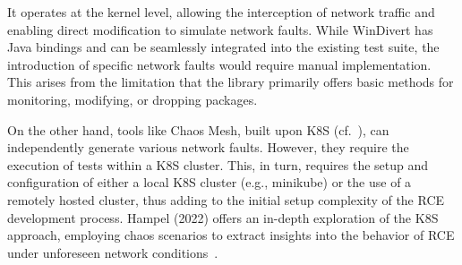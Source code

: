 It operates at the kernel level, allowing the interception of network traffic and enabling direct modification to simulate network faults. While WinDivert has Java bindings and can be seamlessly integrated into the existing test suite, the introduction of specific network faults would require manual implementation. This arises from the limitation that the library primarily offers basic methods for monitoring, modifying, or dropping packages.

On the other hand, tools like Chaos Mesh, built upon \ac{K8S} (cf.~), can independently generate various network faults. However, they require the execution of tests within a \ac{K8S} cluster. This, in turn, requires the setup and configuration of either a local \ac{K8S} cluster (e.g., minikube) or the use of a remotely hosted cluster, thus adding to the initial setup complexity of the \ac{RCE} development process. Hampel (2022) offers an in-depth exploration of the \ac{K8S} approach, employing chaos scenarios to extract insights into the behavior of \ac{RCE} under unforeseen network conditions~\cite{Hampel2022}.

